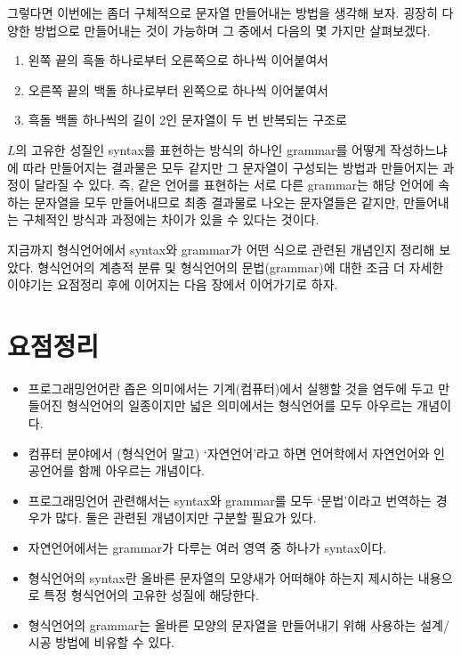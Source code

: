 그렇다면 이번에는 좀더 구체적으로 문자열 \txtbullet\txtcircle\txtbullet{}
만들어내는 방법을 생각해 보자. 굉장히 다양한 방법으로 만들어내는 것이 가능하며
그 중에서 다음의 몇 가지만 살펴보겠다.
\begin{enumerate}
    \item
    \fbox{\fbox{\fbox{\fbox{\!\txtbullet\!}\,\txtcircle\!}\,\txtbullet\!}\,\txtcircle\!}
    왼쪽 끝의 흑돌 하나로부터 오른쪽으로 하나씩 이어붙여서
    \item
    \fbox{\!\txtbullet\,\fbox{\!\txtcircle\,\fbox{\!\txtbullet\,\fbox{\!\txtcircle\!}}}}
    오른쪽 끝의 백돌 하나로부터 왼쪽으로 하나씩 이어붙여서
    \item
    \fbox{\fbox{\!\fbox{\!\txtbullet\!}\,\txtcircle\!}\,\fbox{\!\fbox{\!\txtbullet\!}\,\txtcircle\!}}
    흑돌 백돌 하나씩의 길이 2인 문자열이 두 번 반복되는 구조로
\end{enumerate}
$L$의 고유한 성질인 syntax를 표현하는 방식의 하나인 grammar를 어떻게 작성하느냐에
따라 만들어지는 결과물은 모두 \txtbullet\txtcircle\txtbullet{} 같지만
그 문자열이 구성되는 방법과 만들어지는 과정이 달라질 수 있다. 즉, 같은 언어를 표현하는
서로 다른 grammar는 해당 언어에 속하는 문자열을 모두 만들어내므로 최종 결과물로 나오는
문자열들은 같지만, 만들어내는 구체적인 방식과 과정에는 차이가 있을 수 있다는 것이다.

지금까지 형식언어에서 syntax와 grammar가 어떤 식으로 관련된 개념인지 정리해 보았다.
형식언어의 계층적 분류 및 형식언어의 문법(grammar)에 대한 조금 더 자세한 이야기는
요점정리 후에 이어지는 다음 장에서 이어가기로 하자.

\section*{요점정리}
\begin{itemize}
    \item 프로그래밍언어란 좁은 의미에서는 기계(컴퓨터)에서 실행할 것을
    염두에 두고 만들어진 형식언어의 일종이지만 넓은 의미에서는 형식언어를
    모두 아우르는 개념이다.
    \item
    컴퓨터 분야에서 (형식언어 말고) `자연언어'라고 하면
    언어학에서 자연언어와 인공언어를 함께 아우르는 개념이다.
    \item
    프로그래밍언어 관련해서는 syntax와 grammar를 모두 `문법'이라고
    번역하는 경우가 많다. 둘은 관련된 개념이지만 구분할 필요가 있다.
    \item
    자연언어에서는 grammar가 다루는 여러 영역 중 하나가 syntax이다.
    \item
    형식언어의 syntax란 올바른 문자열의 모양새가 어떠해야 하는지 제시하는
    내용으로 특정 형식언어의 고유한 성질에 해당한다.
    \item
    형식언어의 grammar는 올바른 모양의 문자열을 만들어내기 위해
    사용하는 설계/시공 방법에 비유할 수 있다.
\end{itemize}


